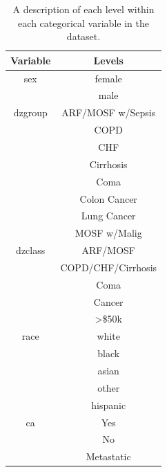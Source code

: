\documentclass[
]{jss}
\begin{document}
\begin{table}[ht]
\centering
\begin{tabular}{cc}
\hline
\textbf{Variable} & \textbf{Levels}                      \\
\hline
sex      & female                                        \\
         & male                                          \\
dzgroup  & ARF/MOSF w/Sepsis                             \\
         & COPD                                          \\
         & CHF                                           \\
         & Cirrhosis                                     \\
         & Coma                                          \\
         & Colon Cancer                                  \\
         & Lung Cancer                                   \\
         & MOSF w/Malig                                  \\
dzclass  & ARF/MOSF                                      \\
         & COPD/CHF/Cirrhosis                            \\
         & Coma                                          \\
         & Cancer                                        \\
         & \textgreater{}\$50k                           \\
race     & white                                         \\
         & black                                         \\
         & asian                                         \\
         & other                                         \\
         & hispanic                                      \\
ca       & Yes                                           \\
         & No                                            \\
         & Metastatic                                    \\
\end{tabular}
\caption{A description of each level within each categorical variable in the dataset.}
\label{tab:support2}
\end{table}
\end{document}
